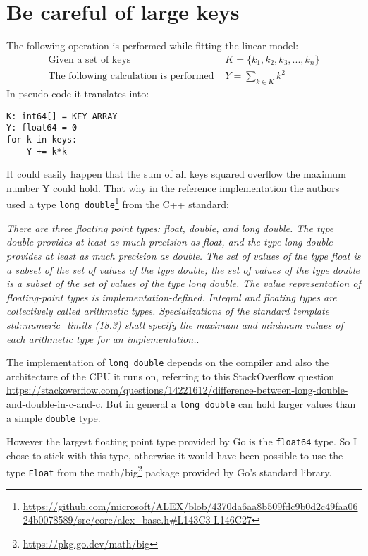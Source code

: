 \section{Be careful of large keys}
The following operation is performed while fitting the linear model:
\begin{align*}
\text{Given a set of keys } & K = \{k_1, k_2, k_3, ..., k_n \}\\
\text{The following calculation is performed } & Y = \sum_{k \in K}k^2
\end{align*}
In pseudo-code it translates into:
\begin{lstlisting}
K: int64[] = KEY_ARRAY
Y: float64 = 0
for k in keys:
    Y += k*k
\end{lstlisting}
It could easily happen that the sum of all keys squared overflow the maximum number Y could hold. That why in the reference implementation the authors used a type \texttt{long double}\footnote{\url{https://github.com/microsoft/ALEX/blob/4370da6aa8b509fdc9b0d2c49faa0624b0078589/src/core/alex_base.h\#L143C3-L146C27}} from the C++ standard:

\textit{There are three floating point types: float, double, and long double. The type double provides at least as much precision as float, and the type long double provides at least as much precision as double. The set of values of the type float is a subset of the set of values of the type double; the set of values of the type double is a subset of the set of values of the type long double. The value representation of floating-point types is implementation-defined. Integral and floating types are collectively called arithmetic types. Specializations of the standard template std::numeric\_limits (18.3) shall specify the maximum and minimum values of each arithmetic type for an implementation.}.

The implementation of \texttt{long double} depends on the compiler and also the architecture of the CPU it runs on, referring to this StackOverflow question \url{https://stackoverflow.com/questions/14221612/difference-between-long-double-and-double-in-c-and-c}. But in general a \texttt{long double} can hold larger values than a simple \texttt{double} type.

However the largest floating point type provided by Go is the \texttt{float64} type. So I chose to stick with this type, otherwise it would have been possible to use the type \texttt{Float} from the math/big\footnote{\url{https://pkg.go.dev/math/big}} package provided by Go's standard library.


